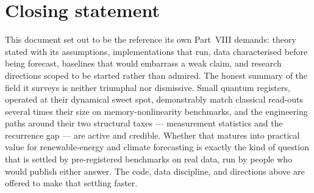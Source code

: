 \section{Closing statement}
\label{sec:closing}

This document set out to be the reference its own Part~VIII demands:
theory stated with its assumptions, implementations that run, data
characterised before being forecast, baselines that would embarrass a weak
claim, and research directions scoped to be started rather than admired.
The honest summary of the field it surveys is neither triumphal nor
dismissive. Small quantum registers, operated at their dynamical sweet
spot, demonstrably match classical read-outs several times their size on
memory-nonlinearity benchmarks, and the engineering paths around their two
structural taxes --- measurement statistics and the recurrence gap --- are
active and credible. Whether that matures into practical value for
renewable-energy and climate forecasting is exactly the kind of question
that is settled by pre-registered benchmarks on real data, run by people
who would publish either answer. The code, data discipline, and directions
above are offered to make that settling faster.
